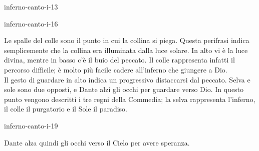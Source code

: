 \documentclass[preview]{standalone}
\begin{document}
\begin{snippet}{inferno-canto-i-13}
\end{snippet}

\begin{snippet}{inferno-canto-i-16}

    Le spalle del colle sono il punto in cui la collina si piega.
    Questa perifrasi indica semplicemente che la collina era illuminata dalla luce solare.
    In alto vi è la luce divina, mentre in basso c'è il buio del peccato.
    Il colle rappresenta infatti il percorso difficile; è molto più facile
    cadere all'inferno che giungere a Dio. \\
    Il gesto di guardare in alto indica un progressivo distaccarsi dal peccato.
    Selva e sole sono due opposti, e Dante alzi gli occhi per guardare verso Dio.
    In questo punto vengono descritti i tre regni della Commedia; la selva rappresenta
    l'inferno, il colle il purgatorio e il Sole il paradiso.
\end{snippet}

\begin{snippet}{inferno-canto-i-19}
\end{snippet}

Dante alza quindi gli occhi verso il Cielo per avere speranza.
\end{document}
